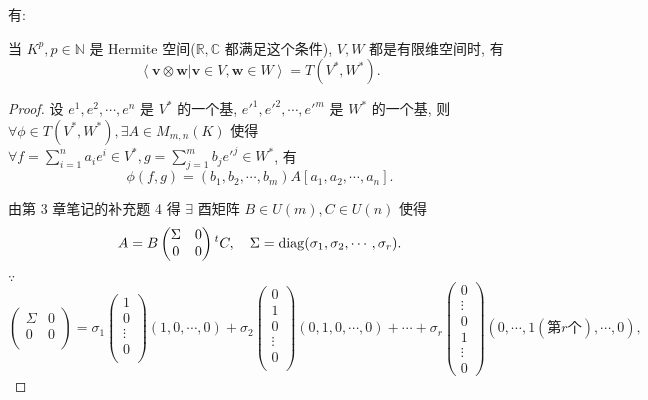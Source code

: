 \documentclass{ctexart}
\begin{document}
有:
\begin{theorem}\label{t1.4}
    当 $K^p,p\in\mathbb{N}$ 是 Hermite 空间($\mathbb{R},\mathbb{C}$ 都满足这个条件), $V,W$ 都是有限维空间时, 有
    \[\left<\boldsymbol{v}\otimes\boldsymbol{w}|\boldsymbol{v}\in V,\boldsymbol{w}\in W\right>=T(V^*,W^*).\]
\end{theorem}
\begin{proof}
    设 $e^1,e^2,\cdots,e^n$ 是 $V^*$ 的一个基, $e'^1,e'^2,\cdots,e'^m$ 是 $W^*$ 的一个基, 则 $\forall \phi\in T(V^*,W^*),\exists A\in M_{m,n}(K)$ 使得 $\forall f=\sum\limits_{i=1}^na_ie^i\in V^*,g=\sum\limits_{j=1}^mb_je'^j\in W^*$, 有
    \[\phi(f,g)=(b_1,b_2,\cdots,b_m)A[a_1,a_2,\cdots,a_n].\]

    由第 3 章笔记的补充题 4 得 $\exists$ 酉矩阵 $B\in U(m),C\in U(n)$ 使得
    \[A=B\begin{pmatrix}
        \Sigma & 0 \\
        0 & 0 \\
    \end{pmatrix}{}^tC,\quad\Sigma=\operatorname{diag} (\sigma_1,\sigma_2,\cdots,\sigma_r).\]
    
    $\because$
    \[\begin{pmatrix}
        \Sigma & 0 \\
        0 & 0 \\
    \end{pmatrix}=\sigma_1\begin{pmatrix}
        1 \\
        0 \\
        \vdots \\
        0 \\
    \end{pmatrix}(1,0,\cdots,0)+\sigma_2\begin{pmatrix}
        0 \\
        1 \\
        0 \\
        \vdots \\
        0 \\
    \end{pmatrix}(0,1,0,\cdots,0)+\cdots+\sigma_r\begin{pmatrix}
        0 \\
        \vdots \\
        0 \\
        1 \\
        \vdots \\
        0
    \end{pmatrix}(0,\cdots,1(\text{第}r\text{个}),\cdots,0),\]


\end{proof}
\end{document}
